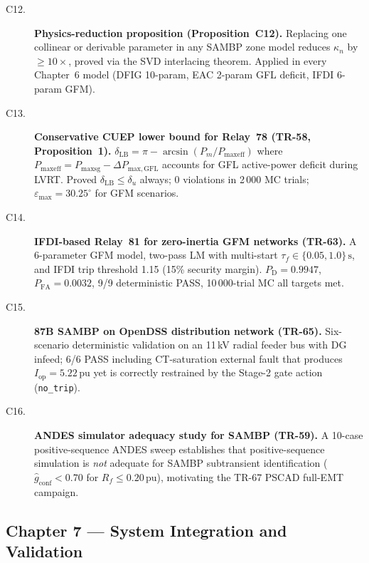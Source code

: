 \documentclass
    [phd,synopsis]
    {iitmdissertation}
\newcommand{\pu}{\,\text{pu}}
\newcommand{\PD}{P_{\mathrm{D}}}
\newcommand{\PFA}{P_{\mathrm{FA}}}
\newcommand{\kn}{\kappa_n}
\newcommand{\dLB}{\delta_{\mathrm{LB}}}
\begin{document}
\begin{description}
  \item[C12.] \textbf{Physics-reduction proposition (Proposition~C12).}
    Replacing one collinear or derivable parameter in any SAMBP zone model
    reduces $\kn$ by $\geq 10\times$, proved via the SVD interlacing theorem.
    Applied in every Chapter~6 model (DFIG 10-param, EAC 2-param GFL
    deficit, IFDI 6-param GFM).

  \item[C13.] \textbf{Conservative CUEP lower bound for Relay~78 (TR-58,
    Proposition~1).}
    $\dLB = \pi - \arcsin(P_m / P_{\mathrm{maxeff}})$ where
    $P_{\mathrm{maxeff}} = P_{\mathrm{maxsg}} - \Delta P_{\mathrm{max,GFL}}$
    accounts for GFL active-power deficit during LVRT.
    Proved $\dLB \leq \delta_u$ always; 0 violations in 2\,000 MC trials;
    $\varepsilon_{\max} = 30.25^\circ$ for GFM scenarios.

  \item[C14.] \textbf{IFDI-based Relay~81 for zero-inertia GFM networks
    (TR-63).}
    A 6-parameter GFM model, two-pass LM with multi-start
    $\tau_f \in \{0.05, 1.0\}\,\text{s}$, and IFDI trip threshold 1.15
    (15\% security margin).
    $\PD = 0.9947$, $\PFA = 0.0032$, 9/9 deterministic PASS,
    10\,000-trial MC all targets met.

  \item[C15.] \textbf{87B SAMBP on OpenDSS distribution network (TR-65).}
    Six-scenario deterministic validation on an 11\,kV radial feeder bus
    with DG infeed; 6/6 PASS including CT-saturation external fault that
    produces $I_{\mathrm{op}} = 5.22\pu$ yet is correctly restrained by the
    Stage-2 gate action (\texttt{no\_trip}).

  \item[C16.] \textbf{ANDES simulator adequacy study for SAMBP (TR-59).}
    A 10-case positive-sequence ANDES sweep establishes that
    positive-sequence simulation is \emph{not} adequate for SAMBP
    subtransient identification
    ($\hat{g}_{\mathrm{conf}} < 0.70$ for $R_f \leq 0.20\pu$),
    motivating the TR-67 PSCAD full-EMT campaign.
\end{description}

\subsection*{Chapter 7 — System Integration and Validation}
\end{document}
